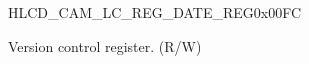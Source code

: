 \begin{register}{H}{LCD\_CAM\_LC\_REG\_DATE\_REG}{0x00FC}\label{regdesc:LCDCAMLCREGDATEREG}
%
%
\regnewline%
\begin{regdesc}\begin{reglist}
\label{fielddesc:LCDCAMLCDATE}\item [LCD\_CAM\_LC\_DATE] Version control register. (R/W)
\end{reglist}\end{regdesc}
\end{register}


